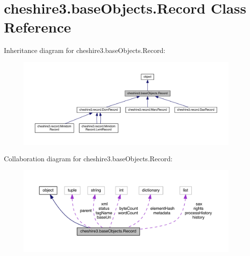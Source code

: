 \hypertarget{classcheshire3_1_1base_objects_1_1_record}{\section{cheshire3.\-base\-Objects.\-Record Class Reference}
\label{classcheshire3_1_1base_objects_1_1_record}
}


Inheritance diagram for cheshire3.\-base\-Objects.\-Record\-:
\nopagebreak
\begin{figure}[H]
\begin{center}
\leavevmode
\includegraphics[width=350pt]{classcheshire3_1_1base_objects_1_1_record__inherit__graph}
\end{center}
\end{figure}


Collaboration diagram for cheshire3.\-base\-Objects.\-Record\-:
\nopagebreak
\begin{figure}[H]
\begin{center}
\leavevmode
\includegraphics[width=350pt]{classcheshire3_1_1base_objects_1_1_record__coll__graph}
\end{center}
\end{figure}
